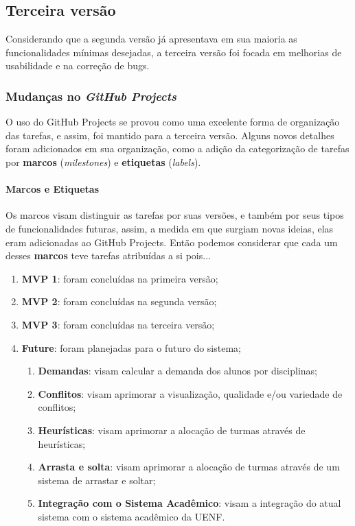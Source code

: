 \subsection{Terceira versão} %

Considerando que a segunda versão já apresentava em sua maioria as funcionalidades mínimas desejadas, a terceira versão foi focada em melhorias de usabilidade e na correção de bugs.

\subsubsection{Mudanças no \textit{GitHub Projects}}

O uso do GitHub Projects se provou como uma excelente forma de organização das tarefas, e assim, foi mantido para a terceira versão. Alguns novos detalhes foram adicionados em sua organização, como a adição da categorização de tarefas por \textbf{marcos} (\textit{milestones}) e \textbf{etiquetas} (\textit{labels}).

\paragraph*{Marcos e Etiquetas}

Os marcos visam distinguir as tarefas por suas versões, e também por seus tipos de funcionalidades futuras, assim, a medida em que surgiam novas ideias, elas eram adicionadas ao GitHub Projects. Então podemos considerar que cada um desses \textbf{marcos} teve tarefas atribuídas a si pois...

\begin{enumerate}
  \item \textbf{MVP 1}: foram concluídas na primeira versão;
  \item \textbf{MVP 2}: foram concluídas na segunda versão;
  \item \textbf{MVP 3}: foram concluídas na terceira versão;
  \item \textbf{Future}: foram planejadas para o futuro do sistema;
        \begin{enumerate}
          \item \textbf{Demandas}: visam calcular a demanda dos alunos por disciplinas;
          \item \textbf{Conflitos}: visam aprimorar a visualização, qualidade e/ou variedade de conflitos;
          \item \textbf{Heurísticas}: visam aprimorar a alocação de turmas através de heurísticas;
          \item \textbf{Arrasta e solta}: visam aprimorar a alocação de turmas através de um sistema de arrastar e soltar;
          \item \textbf{Integração com o Sistema Acadêmico}: visam a integração do atual sistema com o sistema acadêmico da UENF.
        \end{enumerate}
\end{enumerate}

